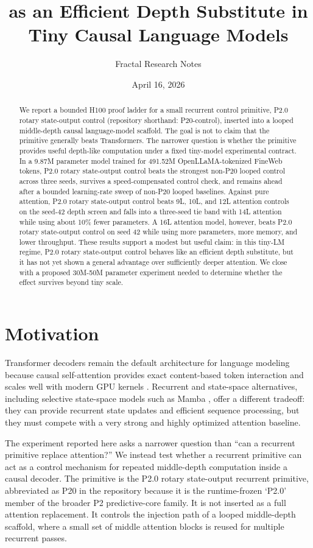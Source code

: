 \documentclass[11pt]{article}
\title{\pcontrol{} as an Efficient Depth Substitute in Tiny Causal Language Models}
\author{Fractal Research Notes}
\date{April 16, 2026}
\newcommand{\pshort}{P20}
\newcommand{\pname}{P2.0 rotary state-output}
\newcommand{\pcontrol}{P2.0 rotary state-output control}
\newcommand{\preposhort}{P20-control}
\begin{document}
\maketitle

\begin{abstract}
We report a bounded H100 proof ladder for a small recurrent control primitive,
\pcontrol{} (repository shorthand: \preposhort{}), inserted into a looped
middle-depth causal language-model scaffold.
The goal is not to claim that the primitive generally beats Transformers.
The narrower question is whether the primitive provides useful depth-like
computation under a fixed tiny-model experimental contract. In a 9.87M
parameter model trained for 491.52M OpenLLaMA-tokenized FineWeb tokens,
\pcontrol{} beats the strongest non-\pshort{} looped control across three seeds,
survives a speed-compensated control check, and remains ahead after a bounded
learning-rate sweep of non-\pshort{} looped baselines. Against pure attention,
\pcontrol{} beats 9L, 10L, and 12L attention controls on the seed-42 depth
screen and falls into a three-seed tie band with 14L attention while using
about 10\% fewer parameters. A 16L attention model, however, beats \pcontrol{}
on seed 42 while using more parameters, more memory, and lower throughput.
These results support a modest but useful claim: in this tiny-LM regime,
\pcontrol{} behaves like an efficient depth substitute, but it has not yet
shown a general advantage over sufficiently deeper attention. We close with a
proposed 30M-50M parameter experiment needed to determine whether the effect
survives beyond tiny scale.
\end{abstract}

\section{Motivation}

Transformer decoders remain the default architecture for language modeling
because causal self-attention provides exact content-based token interaction
and scales well with modern GPU kernels \cite{vaswani2017attention,
dao2022flashattention}. Recurrent and state-space alternatives, including
selective state-space models such as Mamba \cite{gu2023mamba}, offer a
different tradeoff: they can provide recurrent state updates and efficient
sequence processing, but they must compete with a very strong and highly
optimized attention baseline.

The experiment reported here asks a narrower question than ``can a recurrent
primitive replace attention?'' We instead test whether a recurrent primitive
can act as a control mechanism for repeated middle-depth computation inside a
causal decoder. The primitive is the \pname{} recurrent primitive, abbreviated
as \pshort{} in the repository because it is the runtime-frozen `P2.0' member
of the broader P2 predictive-core family. It is not inserted as a full
attention replacement. It controls the injection path of a looped middle-depth
scaffold, where a small set of middle attention blocks is reused for multiple
recurrent passes.
\end{document}
